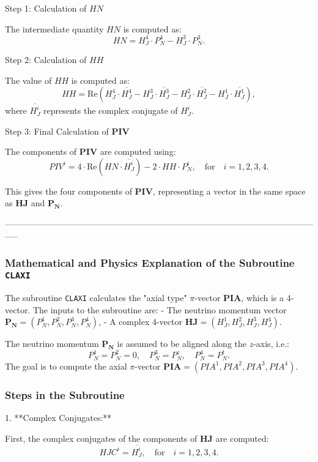 \documentclass[12pt]{article}
\begin{document}
Step 1: Calculation of $HN$

The intermediate quantity $HN$ is computed as:
\[
HN = H_J^4 \cdot P_N^4 - H_J^3 \cdot P_N^3.
\]

Step 2: Calculation of $HH$

The value of $HH$ is computed as:
\[
HH = \text{Re}(H_J^4 \cdot \overline{H_J^4} - H_J^3 \cdot \overline{H_J^3} - H_J^2 \cdot \overline{H_J^2} - H_J^1 \cdot \overline{H_J^1}),
\]
where $\overline{H_J^i}$ represents the complex conjugate of $H_J^i$.

Step 3: Final Calculation of $\mathbf{PIV}$

The components of $\mathbf{PIV}$ are computed using:
\[
PIV^i = 4 \cdot \text{Re}(HN \cdot \overline{H_J^i}) - 2 \cdot HH \cdot P_N^i, \quad \text{for} \quad i = 1, 2, 3, 4.
\]

This gives the four components of $\mathbf{PIV}$, representing a vector in the same space as $\mathbf{HJ}$ and $\mathbf{P_N}$.

-----------------------------------------------------------------------------------------------------------------\\

\subsubsection*{Mathematical and Physics Explanation of the Subroutine \texttt{CLAXI}}

The subroutine \texttt{CLAXI} calculates the "axial type" \(\pi\)-vector \(\mathbf{PIA}\), which is a 4-vector. The inputs to the subroutine are:
- The neutrino momentum vector \(\mathbf{P_N} = (P_N^1, P_N^2, P_N^3, P_N^4)\),
- A complex 4-vector \(\mathbf{HJ} = (H_J^1, H_J^2, H_J^3, H_J^4)\).

The neutrino momentum \(\mathbf{P_N}\) is assumed to be aligned along the \(z\)-axis, i.e.:
\[
P_N^1 = P_N^2 = 0, \quad P_N^3 = P_N^z, \quad P_N^4 = P_N^t.
\]
The goal is to compute the axial \(\pi\)-vector \(\mathbf{PIA} = (PIA^1, PIA^2, PIA^3, PIA^4)\).

\subsubsection*{Steps in the Subroutine}

1. **Complex Conjugates:**

   First, the complex conjugates of the components of \(\mathbf{HJ}\) are computed:
   \[
   HJC^i = \overline{H_J^i}, \quad \text{for} \quad i = 1, 2, 3, 4.
   \]
\end{document}
